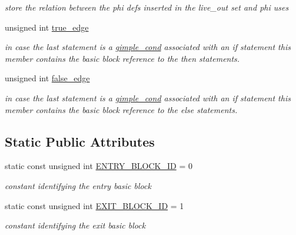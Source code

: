 \begin{DoxyCompactItemize}
\begin{DoxyCompactList}\small\item\em store the relation between the phi defs inserted in the live\+\_\+out set and phi uses \end{DoxyCompactList}\item 
unsigned int \hyperlink{structbloc_a6ff01e0eb0e2d225be8bec35d051648a}{true\+\_\+edge}
\begin{DoxyCompactList}\small\item\em in case the last statement is a \hyperlink{structgimple__cond}{gimple\+\_\+cond} associated with an if statement this member contains the basic block reference to the then statements. \end{DoxyCompactList}\item 
unsigned int \hyperlink{structbloc_a6547bb608567a0d14a9ef12a131252c5}{false\+\_\+edge}
\begin{DoxyCompactList}\small\item\em in case the last statement is a \hyperlink{structgimple__cond}{gimple\+\_\+cond} associated with an if statement this member contains the basic block reference to the else statements. \end{DoxyCompactList}\end{DoxyCompactItemize}
\subsection*{Static Public Attributes}
\begin{DoxyCompactItemize}
\item 
static const unsigned int \hyperlink{structbloc_a008776f48d27c319d67b684055506087}{E\+N\+T\+R\+Y\+\_\+\+B\+L\+O\+C\+K\+\_\+\+ID} = 0
\begin{DoxyCompactList}\small\item\em constant identifying the entry basic block \end{DoxyCompactList}\item 
static const unsigned int \hyperlink{structbloc_a5e5f687ad1bd5bfaf6e1ba9774e1cdd3}{E\+X\+I\+T\+\_\+\+B\+L\+O\+C\+K\+\_\+\+ID} = 1
\begin{DoxyCompactList}\small\item\em constant identifying the exit basic block \end{DoxyCompactList}\end{DoxyCompactItemize}

